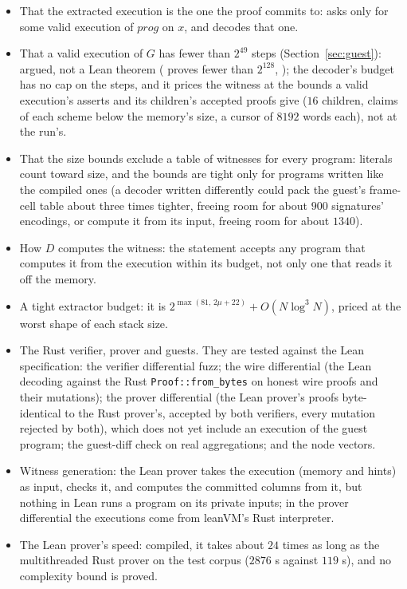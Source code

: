 \documentclass[11pt]{article}
\begin{document}
\begin{itemize}
bounds and budgets; the end theorem holds at 's compiled 
and  (,
).
\item That the extracted execution is the one the proof commits to: 
asks only for some valid execution of $\mathit{prog}$ on $x$, and  decodes that one.
\item That a valid execution of $G$ has fewer than $2^{49}$ steps (Section~\ref{sec:guest}): argued,
not a Lean theorem ( proves fewer than $2^{128}$, ); the
decoder's budget has no cap on the steps, and it prices the witness at the bounds a valid
execution's asserts and its children's accepted proofs give ($16$ children, claims of each scheme
below the memory's size, a cursor of $8192$ words each), not at the run's.
\item That the size bounds exclude a table of witnesses for every program: literals count toward
size, and the bounds are tight only for programs written like the compiled ones (a decoder
written differently could pack the guest's frame-cell table about three times tighter, freeing
room for about $900$ signatures' encodings, or compute it from its input, freeing room for about $1340$).
\item How $D$ computes the witness: the statement accepts any program that computes it from the
execution within its budget, not only one that reads it off the memory.
\item A tight extractor budget: it is $2^{\max(81,\,2\mu + 22)} + O(N\log^3 N)$, priced at the worst shape of each stack size.
\item The Rust verifier, prover and guests. They are tested against the Lean specification: the
verifier differential fuzz; the wire differential (the Lean decoding against the Rust
\texttt{Proof::from\_bytes} on honest wire proofs and their mutations); the prover differential (the Lean prover's proofs byte-identical to the
Rust prover's, accepted by both verifiers, every mutation rejected by both), which does not yet
include an execution of the guest program; the guest-diff check on real aggregations; and the node
vectors.
\item Witness generation: the Lean prover takes the execution (memory and hints) as input, checks
it, and computes the committed columns from it, but nothing in Lean runs a program on its private
inputs; in the prover differential the executions come from leanVM's Rust interpreter.
\item The Lean prover's speed: compiled, it takes about $24$ times as long as the multithreaded
Rust prover on the test corpus ($2876$ s against $119$ s), and no complexity bound is proved.
\end{itemize}
\end{document}
